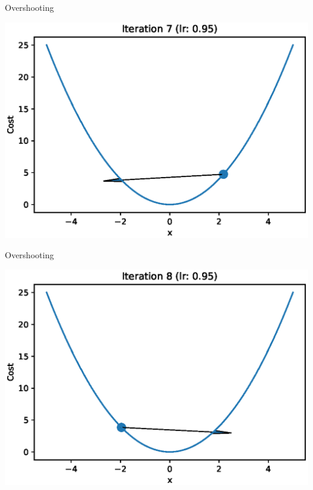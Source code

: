 \documentclass{beamer}
\begin{document}
	\begin{frame}{Overshooting}
		\begin{center}
			\includegraphics[totalheight=6cm]{gradient-descent/overshooting-7.eps}
		\end{center}
	\end{frame}
	
	\begin{frame}{Overshooting}
		\begin{center}
			\includegraphics[totalheight=6cm]{gradient-descent/overshooting-8.eps}
		\end{center}
	\end{frame}
	
\end{document}

